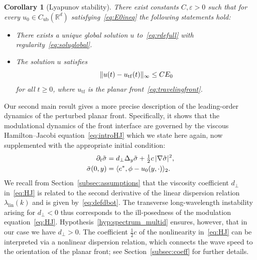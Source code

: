 \documentclass[12pt,oneside,a4paper,reqno]{amsart}
\numberwithin{equation}{section}
\newtheorem{corollary}[theorem]{Corollary}
\theoremstyle{definition}
\theoremstyle{remark}
\newcommand{\bbR}{{\mathbb R}}
\newcommand{\eps}{\varepsilon}
\newcommand{\Cub}{{C_{\mathrm{ub}}}}
\DeclarePairedDelimiter{\abs}{\lvert}{\rvert}
\DeclarePairedDelimiter{\norm}{\lVert}{\rVert}
\begin{document}
\begin{corollary}[Lyapunov stability]
	\label{cor:lyapunov}
    There exist constants $C,\eps > 0$ such that for every $u_0 \in \Cub(\bbR^d)$ satisfying~\eqref{eq:E0ineq} the following statements hold:
    \begin{itemize}
        \item There exists a unique global solution $u$ to~\eqref{eq:rdefull} with regularity~\eqref{eq:soluglobal}.
        \item The solution $u$ satisfies
        \begin{equation}
        \label{eq:lyapunovstable}
    		\norm{u(t) - u_{\mathrm{tf}}(t)}_{\infty} \leq C E_0
    	\end{equation}
        for all $t\geq 0$, where $u_{\mathrm{tf}}$ is the planar front~\eqref{eq:travelingfront}.
    \end{itemize}
\end{corollary}
Our second main result gives a more precise description of the leading-order dynamics of the perturbed planar front. Specifically, it shows that the modulational dynamics of the front interface are governed by the viscous Hamilton--Jacobi equation~\eqref{eq:introHJ} which we state here again, now supplemented with the appropriate initial condition:
\begin{subequations}
\label{eq:HJ}
\begin{align}
    \label{eq:HJ_pde}
    \partial_t \tilde{\sigma} &= d_{\bot}\Delta_y \tilde{\sigma} + \tfrac{1}{2}c\,\abs{\nabla{\tilde{\sigma}}}^2, \\
    \label{eq:HJ_ic}
    \tilde{\sigma}(0,y) &= \langle e^*, \phi - u_0(y,\cdot) \rangle_2.
\end{align}
\end{subequations}
We recall from Section~\ref{subsec:assumptions} that the viscosity coefficient $d_\bot$ in~\eqref{eq:HJ} is related to the second derivative of the linear dispersion relation $\lambda_{\mathrm{lin}}(k)$ and is given by~\eqref{eq:defdbot}. The transverse long-wavelength instability arising for $d_\bot<0$ thus corresponds to the ill-posedness of the modulation equation~\eqref{eq:HJ}. Hypothesis~\ref{hyp:spectrum_multid} ensures, however, that in our case we have $d_\bot>0$. The coefficient $\frac12 c$ of the nonlinearity in~\eqref{eq:HJ} can be interpreted via a nonlinear dispersion relation, which connects the wave speed to the orientation of the planar front; see Section~\ref{subsec:coeff} for further details. 
\end{document}
